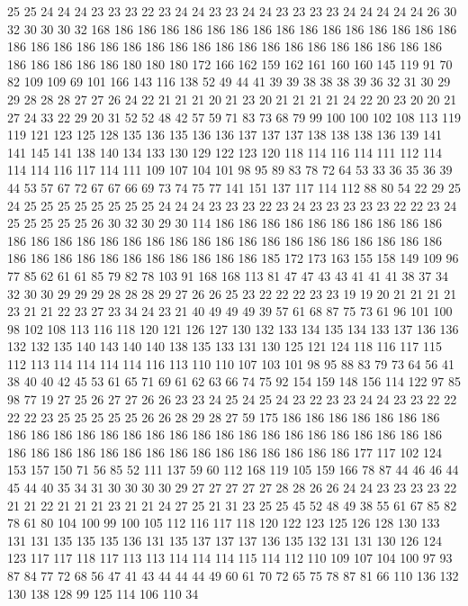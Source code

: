 25 25 24 24 24 23 23 23 22 23 24 24 23 23 24 24 23 23 23 23
24 24 24 24 24 26 30 32 30 30 30 32 168 186 186 186 186 186 186 186
186 186 186 186 186 186 186 186 186 186 186 186 186 186 186 186 186 186 186 186
186 186 186 186 186 186 186 186 186 186 186 186 180 180 180 172 166 162 159 162
161 160 160 145 119 91 70 82 109 109 69 101 166 143 116 138 52 49 44 41
39 39 38 38 38 39 36 32 31 30 29 29 28 28 28 27 27 26 24 22
21 21 21 20 21 23 20 21 21 21 21 24 22 20 23 20 20 21 27 24
33 22 29 20 31 52 52 48 42 57 59 71 83 73 68 79 99 100 100 102
108 113 119 119 121 123 125 128 135 136 135 136 136 137 137 137 138 138 138 136
139 141 141 145 141 138 140 134 133 130 129 122 123 120 118 114 116 114 111 112
114 114 114 116 117 114 111 109 107 104 101 98 95 89 83 78 72 64 53 33
36 35 36 39 44 53 57 67 72 67 67 66 69 73 74 75 77 141 151 137
117 114 112 88 80 54 22 29 25 24 25 25 25 25 25 25 25 25 24 24
24 23 23 23 22 23 24 23 23 23 23 23 22 22 23 24 25 25 25 25
25 26 30 32 30 29 30 114 186 186 186 186 186 186 186 186 186 186 186 186
186 186 186 186 186 186 186 186 186 186 186 186 186 186 186 186 186 186 186 186
186 186 186 186 186 186 186 186 185 172 173 163 155 158 149 109 96 77 85 62
61 61 85 79 82 78 103 91 168 168 113 81 47 47 43 43 41 41 41 38
37 34 32 30 30 29 29 29 28 28 28 29 27 26 26 25 23 22 22 22
23 23 19 19 20 21 21 21 21 23 21 21 22 23 27 23 34 24 23 21
40 49 49 49 39 57 61 68 87 75 73 61 96 101 100 98 102 108 113 116
118 120 121 126 127 130 132 133 134 135 134 133 137 136 136 132 132 135 140 143
140 140 138 135 133 131 130 125 121 124 118 116 117 115 112 113 114 114 114 114
116 113 110 110 107 103 101 98 95 88 83 79 73 64 56 41 38 40 40 42
45 53 61 65 71 69 61 62 63 66 74 75 92 154 159 148 156 114 122 97
85 98 77 19 27 25 26 27 27 26 26 23 23 24 25 24 25 24 23 22
23 23 24 24 23 23 22 22 22 22 23 25 25 25 25 25 26 26 28 29
28 27 59 175 186 186 186 186 186 186 186 186 186 186 186 186 186 186 186 186
186 186 186 186 186 186 186 186 186 186 186 186 186 186 186 186 186 186 186 186
186 186 186 186 186 177 117 102 124 153 157 150 71 56 85 52 111 137 59 60
112 168 119 105 159 166 78 87 44 46 46 44 45 44 40 35 34 31 30 30
30 30 29 27 27 27 27 27 28 28 26 26 24 24 23 23 23 23 22 21
21 22 21 21 21 23 21 21 24 27 25 21 31 23 25 25 45 52 48 49
38 55 61 67 85 82 78 61 80 104 100 99 100 105 112 116 117 118 120 122
123 125 126 128 130 133 131 131 135 135 135 136 131 135 137 137 137 136 135 132
131 131 130 126 124 123 117 117 118 117 113 113 114 114 114 115 114 112 110 109
107 104 100 97 93 87 84 77 72 68 56 47 41 43 44 44 44 49 60 61
70 72 65 75 78 87 81 66 110 136 132 130 138 128 99 125 114 106 110 34
